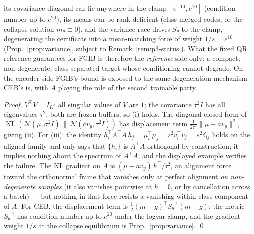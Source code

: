 \begin{proposition}
its covariance diagonal can lie anywhere in the clamp $[e^{-10}, e^{10}]$ (condition
number up to $e^{20}$), its means can be rank-deficient (class-merged codes, or the
collapse solution $m_\theta \equiv 0$), and the variance race drives $S_\theta$ to the
clamp, degenerating the certificate into a mean-matching force of weight $1/s = e^{10}$
(Prop.~\ref{prop:variance}, subject to Remark~\ref{rem:p3-status}). What the fixed QR
reference guarantees for FGIB is therefore the \emph{reference} side only: a compact,
non-degenerate, class-separated target whose conditioning cannot degrade. On the
encoder side FGIB's bound is exposed to the same degeneration mechanism CEB's is, with
$A$ playing the role of the second trainable party.
\end{proposition}

\begin{proof}
$V^{\top}V = I_K$: all singular values of $V$ are $1$; the covariance $\tau^2 I$ has
all eigenvalues $\tau^2$; both are frozen buffers, so (i) holds. The diagonal closed
form of
$\operatorname{KL}(\mathcal{N}(\mu, \sigma^2 I)\,\|\,\mathcal{N}(a v_y, \tau^2 I))$
has displacement term $\tfrac{1}{2\tau^2}\|\mu - a v_y\|^2$, giving (ii). For (iii):
the identity
$h_i^{\top} A^{\top} A\, h_j = \mu_i^{\top}\mu_j = s^2 v_i^{\top} v_j = s^2\delta_{ij}$
holds on the aligned family and only says that $\{h_i\}$ is $A^{\top}A$-orthogonal by
construction; it implies nothing about the spectrum of $A^{\top}A$, and the displayed
example verifies the failure. The KL gradient on $A$ is
$(\mu - a v_y)\,h^{\top}/\tau^2$, an alignment force toward the orthonormal frame that
vanishes only at perfect alignment \emph{on non-degenerate samples} (it also vanishes
pointwise at $h = 0$, or by cancellation across a batch) --- but nothing in that force
resists a vanishing within-class component of $A$. For CEB, the displacement term is
$\tfrac12(m - g)^{\top} S_\theta^{-1}(m - g)$: the metric $S_\theta^{-1}$ has condition
number up to $e^{20}$ under the logvar clamp, and the gradient weight $1/s$ at the
collapse equilibrium is Prop.~\ref{prop:variance}. \hfill\qed
\end{proof}


